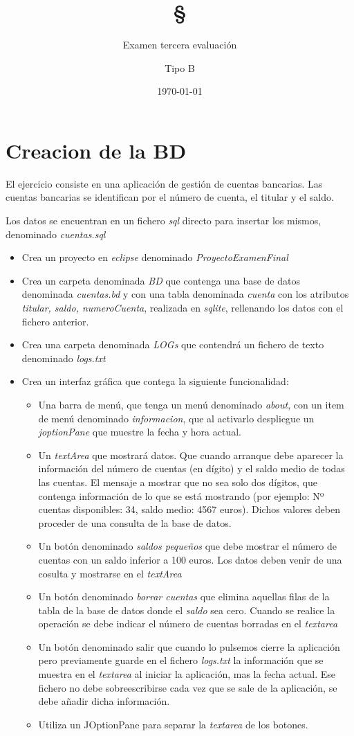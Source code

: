 \documentclass[4paper]{article}
\author{Examen tercera evaluación}
\author{Tipo B}
\title{\textbf{\S}}
\date{\today}
\begin{document}
\maketitle 
\section*{Creacion de la BD}
El ejercicio consiste en una aplicación de gestión de cuentas bancarias. Las cuentas bancarias se identifican por el número de cuenta, el titular y el saldo.\par 
Los datos se encuentran en un fichero \emph{sql} directo para insertar los mismos, denominado \emph{cuentas.sql}
\begin{itemize}
\item Crea un proyecto en \emph{eclipse} denominado \emph{ProyectoExamenFinal}
\item Crea un carpeta denominada \emph{BD} que contenga una base de datos denominada \emph{cuentas.bd} y con una tabla denominada \emph{cuenta} con los atributos \emph{titular, saldo, numeroCuenta}, realizada en \emph{sqlite}, rellenando los datos con el fichero anterior.
\item Crea una carpeta denominada \emph{LOGs} que contendrá un fichero de texto denominado \emph{logs.txt}
\item Crea un interfaz gráfica que contega la siguiente funcionalidad:

\begin{itemize}
\item Una barra de menú, que tenga un menú denominado \emph{about}, con un item de menú denominado \emph{informacion}, que al activarlo despliegue un \emph{joptionPane} que muestre la fecha y hora actual.
\item Un \emph{textArea} que mostrará datos. Que cuando arranque debe aparecer la información del número de cuentas (en dígito) y el saldo medio de todas las cuentas. El mensaje a mostrar que no sea solo dos dígitos, que contenga información de lo que se está mostrando (por ejemplo: Nº cuentas disponibles: 34, saldo medio: 4567 euros). Dichos valores deben proceder de una consulta de la base de datos.
\item Un botón denominado \emph{saldos pequeños} que debe mostrar el número de cuentas con un saldo inferior a 100 euros. Los datos deben venir de una cosulta y mostrarse en el \emph{textArea}
\item Un botón denominado \emph{borrar cuentas} que elimina aquellas filas de la tabla de la base de datos donde el \emph{saldo} sea cero. Cuando se realice la operación se debe indicar el número de cuentas borradas en el \emph{textarea}
\item Un botón denominado salir que cuando lo pulsemos cierre la aplicación pero previamente guarde en el fichero \emph{logs.txt} la información que se muestra en el \emph{textarea} al iniciar la aplicación, mas la fecha actual. Ese fichero no debe sobreescribirse cada vez que se sale de la aplicación, se debe añadir dicha información.
\item Utiliza un JOptionPane para separar la \emph{textarea} de los botones.
\end{itemize}


\end{itemize}
\end{document}
